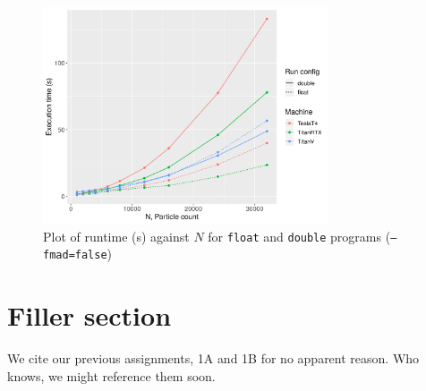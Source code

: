 \documentclass[12pt]{article}
\begin{document}
\begin{figure}[H]
    \centering
    \includegraphics[width=0.75\textwidth]{double-float-comparison-nofmad}
    \caption{Plot of runtime (s) against $N$ for \texttt{float} and \texttt{double} programs (\texttt{--fmad=false})}
    \label{fig:double-float-comparison-nofmad}
\end{figure}

\section{Filler section}

We cite our previous assignments, 1A \cite{assign1aref} and 1B \cite{assign1bref} for no apparent reason. Who knows, we might reference them soon.

\pagebreak



\end{document}
